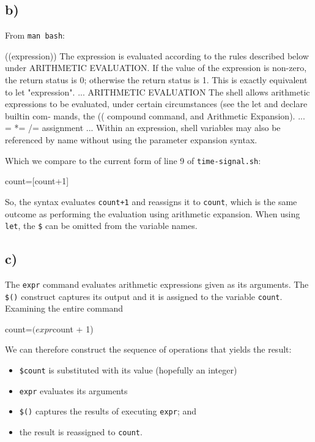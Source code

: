 \documentclass{article}
\begin{document}
\subsection{b)}

From \texttt{man bash}:

\begin{bashinline}
((expression))
      The expression is evaluated according to the rules described below under ARITHMETIC EVALUATION.  If the value of the expression is non-zero, the return status is 0; otherwise the return  status is 1.  This is exactly equivalent to let "expression".
...
ARITHMETIC EVALUATION
       The shell allows arithmetic expressions to be evaluated,  under
       certain  circumstances  (see  the  let and declare builtin com‐
       mands, the ((  compound  command,  and  Arithmetic  Expansion).
...
       = *= /= %
              assignment
...
        Within an expression, shell variables may also be referenced by name
        without using  the parameter  expansion  syntax.
\end{bashinline}

Which we compare to the current form of line 9 of \texttt{time-signal.sh}:

\begin{bashcode}
count=$[$count+1]
\end{bashcode}

So, the syntax  evaluates \texttt{count+1} and reassigns it to \texttt{count}, which is the same outcome as performing the evaluation using arithmetic expansion. When using \texttt{let}, the \texttt{\$} can be omitted from the variable names.

\subsection{c)}

The \texttt{expr} command evaluates arithmetic expressions given as its arguments. The \texttt{\$()} construct captures its output and it is assigned to the variable \texttt{count}. Examining the entire command

\begin{bashcode}
count=$(expr $count + 1)
\end{bashcode}

We can therefore construct the sequence of operations that yields the result:
\begin{itemize}
\item \texttt{\$count} is substituted with its value (hopefully an integer)
\item \texttt{expr} evaluates its arguments
\item \texttt{\$()} captures the results of executing \texttt{expr}; and
\item the result is reassigned to \texttt{count}.
\end{itemize}
\end{document}
